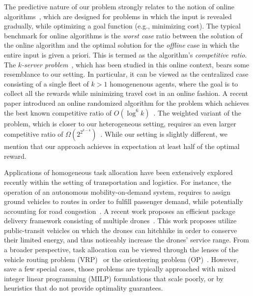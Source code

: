 \documentclass[conference]{IEEEtran}
\begin{document}
The predictive nature of our problem strongly relates to the notion of online algorithms~\cite{FiatWoeginger98,BorodinElYaniv05,HentenryckBent09}, which are designed for problems in which the input is  revealed gradually, while optimizing a goal function (e.g., minimizing cost). The typical benchmark for online algorithms is the \emph{worst case} ratio between the solution of the online algorithm and the optimal solution for the \emph{offline} case in which the entire input is given a priori. This is termed as the algorithm's \emph{competitive ratio}. The \emph{$k$-server problem}~\cite{Koutsoupias09,BertsimasETAL19}, which has been studied in this online context, bears some resemblance to our setting. In particular, it can be viewed as the centralized case consisting of a single fleet of $k>1$ homogenenous agents, where the goal is to collect all the rewards while minimizing travel cost in an online fashion. A recent paper introduced an online randomized algorithm for the problem which achieves the best known competitive ratio of $O(\log^6 k)$~\cite{Lee18}. The weighted variant of the problem, which is closer to our heterogeneous setting, requires an even larger competitive ratio of $\Omega(2^{2^{k-4}})$~\cite{BansalETAL17}. While our setting is slightly different, we mention that our approach achieves in expectation at least half of the optimal reward.

Applications of homogeneous task allocation have been extensively explored recently within the setting of transportation and logistics. For instance, the operation of an autonomous mobility-on-demand system, requires to assign ground vehicles to routes in order to fulfill passenger demand, while potentially accounting for road congestion~\cite{SoloveyETAL19,WallerETAL18,Levine17}. A recent work proposes an efficient package delivery framework consisting of multiple drones~\cite{ChoudhurySoloveyETAL2020}. This work proposes utilize public-transit vehicles on which the drones can hitchhike in order to conserve their limited energy, and thus noticeably increase the drones' service range. From a broader perspective, task allocation can  be viewed through the lenses of the vehicle routing problem (VRP)~\cite{TothVigo2014} or the orienteering problem (OP)~\cite{GunawanETAL16}.%
However, save a few special cases, those problems are typically approached with mixed integer linear programming (MILP) formulations that scale poorly, or by heuristics that do not provide optimality guarantees.
\end{document}
